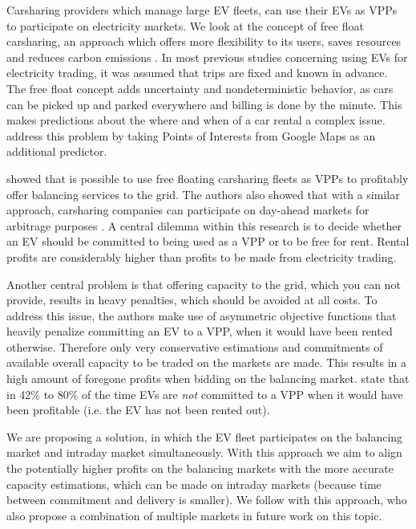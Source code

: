 \documentclass[12pt, article]{article}
\begin{document}
Carsharing providers which manage large EV fleets, can use their EVs as VPPs to
participate on electricity markets. We look at the concept of free float
carsharing, an approach which offers more flexibility to its users, saves
resources and reduces carbon emissions
\parencite{firnkorn15_free_float_elect_carsh_fleet_smart_cities}. In most previous
studies concerning using EVs for electricity trading, it was assumed that trips
are fixed and known in advance. The free float concept adds uncertainty and
nondeterministic behavior, as cars can be picked up and parked everywhere and
billing is done by the minute. This makes predictions about the where and when
of a car rental a complex issue. \textcite{wagner16_in_free_float} address this
problem by taking Points of Interests from Google Maps as an additional
predictor.

\textcite{tomic07_using_fleet_elect_drive_vehic_grid_suppor,kahlen17_fleet} showed
that is possible to use free floating carsharing fleets as VPPs to profitably
offer balancing services to the grid. The authors also showed that with a
similar approach, carsharing companies can participate on day-ahead markets for
arbitrage purposes \parencite{kahlen18_elect_vehic_virtual_power_plant_dilem}. A
central dilemma within this research is to decide whether an EV should be
committed to being used as a VPP or to be free for rent. Rental
profits are considerably higher than profits to be made from electricity
trading.

Another central problem is that offering capacity to the grid, which
you can not provide, results in heavy penalties, which should be avoided at all
costs. To address this issue, the authors make use of asymmetric objective
functions that heavily penalize committing an EV to a VPP, when it would have
been rented otherwise. Therefore only very conservative estimations and
commitments of available overall capacity to be traded on the markets are made.
This results in a high amount of foregone profits when bidding on the balancing
market. \textcite{kahlen15_aggreg_elect_cars_sustain_virtual_power_plant} state
that in 42\% to 80\% of the time EVs are \emph{not} committed to a VPP when it would have been
profitable (i.e. the EV has not been rented out).

We are proposing a solution, in which the EV fleet participates on the balancing
market and intraday market simultaneously. With this approach we aim to align
the potentially higher profits on the balancing markets with the more accurate
capacity estimations, which can be made on intraday markets (because time
between commitment and delivery is smaller). We follow
\textcite{kahlen15_aggreg_elect_cars_sustain_virtual_power_plant} with this
approach, who also propose a combination of multiple markets in future work on
this topic.
\end{document}

